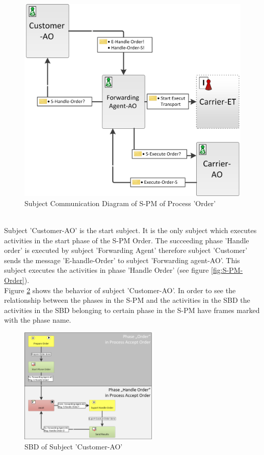 \begin{figure}[hbtp]
	\includegraphics[scale=0.7]{Figures/Chapter5/Subject-Phase/SCD-Order_NEW.png}
	\caption{Subject Communication Diagram of S-PM of Process 'Order'}
	\label{fig:SCD-Order}
\end{figure}
\\
Subject 'Customer-AO' is the start subject. It is the only subject which executes activities in the start phase of the S-PM Order. The succeeding phase 'Handle order' is executed by subject 'Forwarding Agent' therefore subject 'Customer' sends the message 'E-handle-Order' to subject 'Forwarding agent-AO'. This subject executes the activities in phase 'Handle Order' (see figure \ref{fig:S-PM-Order}). \\
Figure \ref{fig:SBD-Customer-AO} shows the behavior of subject 'Customer-AO'. In order to see the relationship between the phases in the S-PM and the activities in the SBD the activities in the SBD belonging to certain phase in the S-PM have frames marked with the phase name.
\begin{figure}[hbtp]
     \begin{center}
	\includegraphics[width=0.6\textwidth]{Figures/Chapter5/Subject-Phase/SBD-Customer-AO_NEW.png}
	\caption{SBD of Subject 'Customer-AO'}
	\label{fig:SBD-Customer-AO}
	 \end{center}
\end{figure}
